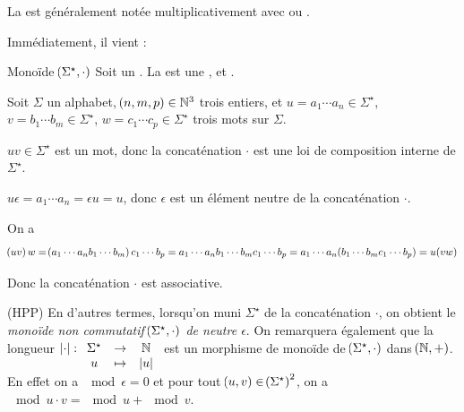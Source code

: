     \begin{notation}
        La  est généralement notée multiplicativement avec  ou .
    \end{notation}
    
    Immédiatement, il vient :
    \begin{property}{Monoïde $\!\left(\Sigma^\star, \cdot\right)$}{}
        Soit \hg{$\Sigma$} un . La  est une ,  et .
    \end{property}
    \begin{nproof}
        Soit $\Sigma$ un alphabet, $\!\left(n, m, p\right) \in \mathbb{N}^3$ trois entiers, et $u = a_1\cdots a_n \in \Sigma^\star$, $v = b_1\cdots b_m \in
        \Sigma^\star$, $w = c_1\cdots c_p \in \Sigma^\star$ trois mots sur $\Sigma$.
        \begin{enumerate}
            \itt $uv \in \Sigma^\star$ est un mot, donc la concaténation $\cdot$ est une loi de composition interne de $\Sigma^\star$.
            
            \itt $u\epsilon = a_1\cdots a_n = \epsilon u = u$, donc $\epsilon$ est un élément neutre de la concaténation $\cdot$.
            
            \itt On a
            \[ \!\left(uv\right)w = \!\left(a_1\cdots a_nb_1\cdots b_m\right)c_1 \cdots b_p = a_1\cdots a_nb_1\cdots b_mc_1\cdots b_p = a_1 \cdots a_n\!\left(b_1 \cdots
            b_mc_1 \cdots b_p\right) = u\!\left(vw\right)\]
        \end{enumerate}
        \qquad\quad Donc la concaténation $\cdot$ est associative.
    \end{nproof}
    
    \textsf{(HPP)} En d'autres termes, lorsqu'on muni $\Sigma^\star$ de la concaténation $\cdot$, on obtient le \emph{monoïde non
    commutatif $\!\left(\Sigma^\star, \cdot\right)$ de neutre $\epsilon$}. On remarquera également que la longueur $\left\lvert\cdot\right\rvert : \begin{array}[t]{ccc}
        \Sigma^\star &\to& \mathbb{N}  \\
        u &\mapsto& \left\lvert u\right\rvert
    \end{array}$ est un morphisme de monoïde de $\!\left(\Sigma^\star, \cdot\right)$ dans $\!\left(\mathbb{N}, +\right)$. En effet on a $\mod{\epsilon} = 0$ et pour tout
    $\!\left(u, v\right) \in \!\left(\Sigma^\star\right)^2$, on a $\mod{u \cdot v} = \mod{u} + \mod{v}$.\medskip
    
